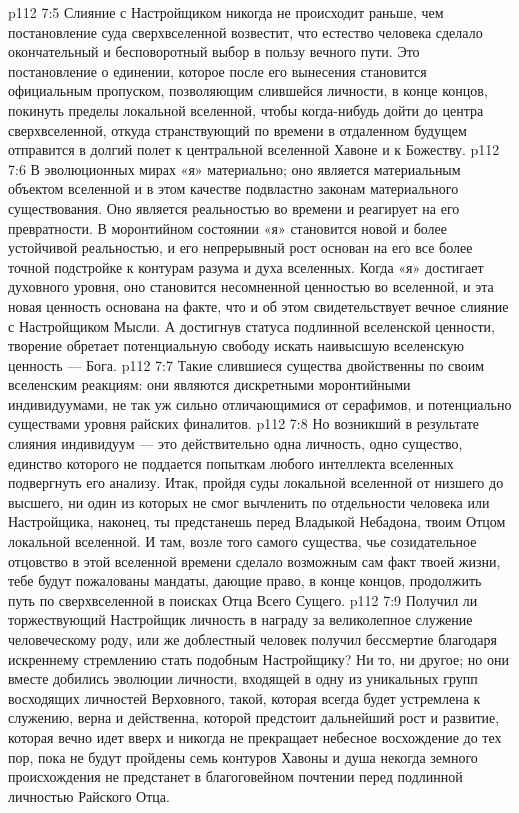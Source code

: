 \vs p112 7:5 Слияние с Настройщиком никогда не происходит раньше, чем постановление суда сверхвселенной возвестит, что естество человека сделало окончательный и бесповоротный выбор в пользу вечного пути. Это постановление о единении, которое после его вынесения становится официальным пропуском, позволяющим слившейся личности, в конце концов, покинуть пределы локальной вселенной, чтобы когда\hyp{}нибудь дойти до центра сверхвселенной, откуда странствующий по времени в отдаленном будущем отправится в долгий полет к центральной вселенной Хавоне и к Божеству.
\vs p112 7:6 \pc В эволюционных мирах «я» материально; оно является материальным объектом вселенной и в этом качестве подвластно законам материального существования. Оно является реальностью во времени и реагирует на его превратности.  В моронтийном состоянии «я» становится новой и более устойчивой реальностью, и его непрерывный рост основан на его все более точной подстройке к контурам разума и духа вселенных.  Когда «я» достигает духовного уровня, оно становится несомненной ценностью во вселенной, и эта новая ценность основана на факте, что  и об этом свидетельствует вечное слияние с Настройщиком Мысли. А достигнув статуса подлинной вселенской ценности, творение обретает потенциальную свободу искать наивысшую вселенскую ценность --- Бога.
\vs p112 7:7 \pc Такие слившиеся существа двойственны по своим вселенским реакциям: они являются дискретными моронтийными индивидуумами, не так уж сильно отличающимися от серафимов, и потенциально существами уровня райских финалитов.
\vs p112 7:8 Но возникший в результате слияния индивидуум --- это действительно одна личность, одно существо, единство которого не поддается попыткам любого интеллекта вселенных подвергнуть его анализу. Итак, пройдя суды локальной вселенной от низшего до высшего, ни один из которых не смог вычленить по отдельности человека или Настройщика, наконец, ты предстанешь перед Владыкой Небадона, твоим Отцом локальной вселенной. И там, возле того самого существа, чье созидательное отцовство в этой вселенной времени сделало возможным сам факт твоей жизни, тебе будут пожалованы мандаты, дающие право, в конце концов, продолжить путь по сверхвселенной в поисках Отца Всего Сущего.
\vs p112 7:9 Получил ли торжествующий Настройщик личность в награду за великолепное служение человеческому роду, или же доблестный человек получил бессмертие благодаря искреннему стремлению стать подобным Настройщику? Ни то, ни другое; но они вместе добились эволюции личности, входящей в одну из уникальных групп восходящих личностей Верховного, такой, которая всегда будет устремлена к служению, верна и действенна, которой предстоит дальнейший рост и развитие, которая вечно идет вверх и никогда не прекращает небесное восхождение до тех пор, пока не будут пройдены семь контуров Хавоны и душа некогда земного происхождения не предстанет в благоговейном почтении перед подлинной личностью Райского Отца.
